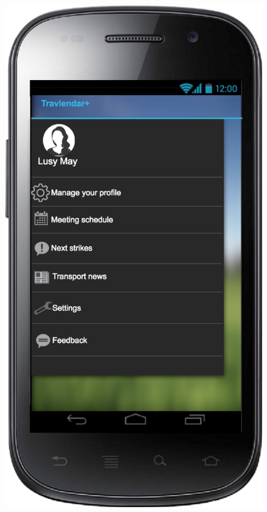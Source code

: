 \documentclass[a4paper,leqno]{article}
\begin{document}
\begin{figure}
	\begin{minipage}[!h]{0.45\linewidth}
		\centering
		\includegraphics[scale = 0.15]{clientMenu.png}
	\end{minipage}
	
	\vspace{3.5 cm}
	

\end{figure}
\end{document}
